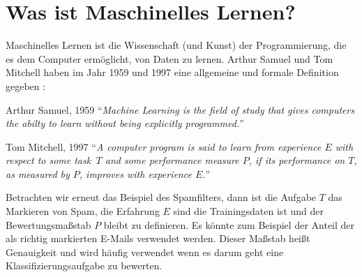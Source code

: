 \section{Was ist Maschinelles Lernen?}
Maschinelles Lernen ist die Wissenschaft (und Kunst) der Programmierung,
die es dem Computer ermöglicht, von Daten zu lernen. Arthur Samuel und Tom Mitchell
haben im Jahr 1959 und 1997 eine allgemeine und formale Definition gegeben \parencite[2]{book:hands-on-ml}:
\begin{aquote}{Arthur Samuel, 1959}
  \enquote{\textit{Machine Learning is the field of study that gives computers
      the abilty to learn without being explicitly programmed.}}
\end{aquote}
\begin{aquote}{Tom Mitchell, 1997}
  \enquote{\textit{A computer program is said to learn from experience
      $E$ with respect to some task \,$T$ and some performance measure $P$,
      if its performance on $T$, as measured by $P$, improves with experience $E$.}}
\end{aquote}
Betrachten wir erneut das Beispiel des Spamfilters, dann ist die Aufgabe $T$
das Markieren von Spam, die Erfahrung
$E$ sind die Trainingsdaten ist und der Bewertungsmaßstab $P$ bleibt zu definieren.
Es könnte zum Beispiel der Anteil der als richtig markierten E-Mails verwendet
werden. Dieser Maßstab heißt Genauigkeit und wird
häufig verwendet wenn es darum geht eine Klassifizierungsaufgabe zu bewerten.

